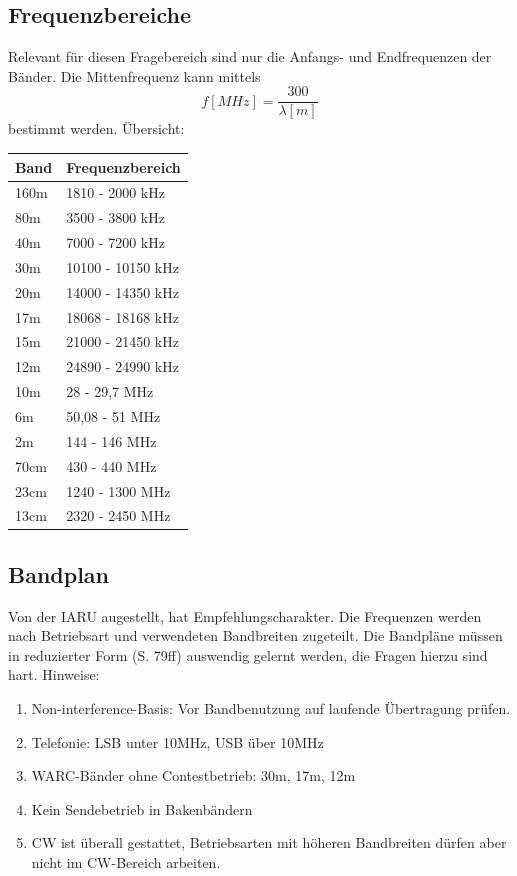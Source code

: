\documentclass[11pt,BCOR=8.5mm]{scrartcl}
\begin{document}
\subsection{Frequenzbereiche}\label{sub:frequenzbereiche}
Relevant für diesen Fragebereich sind nur die Anfangs- und Endfrequenzen
der Bänder. Die Mittenfrequenz kann mittels
\begin{equation}
  f[MHz] = \frac{300}{\lambda[m]}
\end{equation}
bestimmt werden. Übersicht:

\begin{tabular}{|l|l|}
        \hline
        Band & Frequenzbereich \\
        \hline
        160m & 1810 - 2000 kHz\\
        80m & 3500 - 3800 kHz \\
        40m & 7000 - 7200 kHz \\
        30m & 10100 - 10150 kHz \\
        20m & 14000 - 14350 kHz \\
        17m & 18068 - 18168 kHz \\
        15m & 21000 - 21450 kHz \\
        12m & 24890 - 24990 kHz \\
        10m & 28 - 29,7 MHz \\
        6m & 50,08 - 51 MHz \\
        2m & 144 - 146 MHz \\
        70cm & 430 - 440 MHz \\
        23cm & 1240 - 1300 MHz \\
        13cm & 2320 - 2450 MHz \\
        \hline
\end{tabular}

\subsection{Bandplan}
Von der IARU augestellt, hat Empfehlungscharakter. Die Frequenzen werden
nach Betriebsart und verwendeten Bandbreiten zugeteilt. Die Bandpläne
müssen in reduzierter Form (S. 79ff) auswendig gelernt werden, die
Fragen hierzu sind hart. Hinweise:
\begin{enumerate}
  \item Non-interference-Basis: Vor Bandbenutzung auf laufende
    Übertragung prüfen.
  \item Telefonie: LSB unter 10MHz, USB über 10MHz
  \item WARC-Bänder ohne Contestbetrieb: 30m, 17m, 12m
  \item Kein Sendebetrieb in Bakenbändern
  \item CW ist überall gestattet, Betriebsarten mit höheren Bandbreiten
    dürfen aber nicht im CW-Bereich arbeiten.
\end{enumerate}
\end{document}
